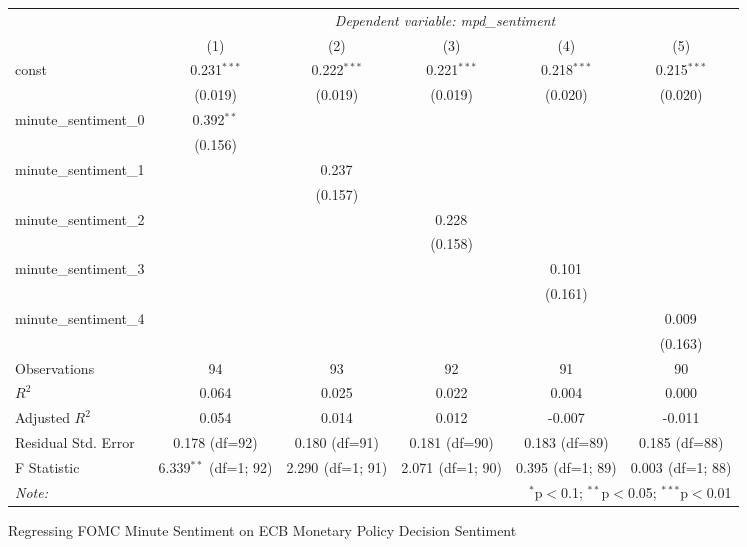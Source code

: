 \documentclass[12pt, letterpaper]{article}
\begin{document}
\begin{table}[H] 
\begin{adjustbox}{width=\textwidth}
\centering
\begin{tabular}{@{}lccccc@{}}
\hline \hline
& \multicolumn{5}{c}{\textit{Dependent variable: mpd\_sentiment}} \\
\cline{2-6}
& (1) & (2) & (3) & (4) & (5) \\
\hline
const & 0.231$^{***}$ & 0.222$^{***}$ & 0.221$^{***}$ & 0.218$^{***}$ & 0.215$^{***}$ \\
& (0.019) & (0.019) & (0.019) & (0.020) & (0.020) \\
minute\_sentiment\_0 & 0.392$^{**}$ & & & & \\
& (0.156) & & & & \\
minute\_sentiment\_1 & & 0.237$^{}$ & & & \\
& & (0.157) & & & \\
minute\_sentiment\_2 & & & 0.228$^{}$ & & \\
& & & (0.158) & & \\
minute\_sentiment\_3 & & & & 0.101$^{}$ & \\
& & & & (0.161) & \\
minute\_sentiment\_4 & & & & & 0.009$^{}$ \\
& & & & & (0.163) \\
\hline
Observations & 94 & 93 & 92 & 91 & 90 \\
$R^2$ & 0.064 & 0.025 & 0.022 & 0.004 & 0.000 \\
Adjusted $R^2$ & 0.054 & 0.014 & 0.012 & -0.007 & -0.011 \\
Residual Std. Error & 0.178 (df=92) & 0.180 (df=91) & 0.181 (df=90) & 0.183 (df=89) & 0.185 (df=88) \\
F Statistic & 6.339$^{**}$ (df=1; 92) & 2.290$^{}$ (df=1; 91) & 2.071$^{}$ (df=1; 90) & 0.395$^{}$ (df=1; 89) & 0.003$^{}$ (df=1; 88) \\
\hline \hline
\textit{Note:} & \multicolumn{5}{r}{$^{*}$p$<$0.1; $^{**}$p$<$0.05; $^{***}$p$<$0.01} \\
\end{tabular}
\end{adjustbox}
\end{table}


Regressing FOMC Minute Sentiment on ECB Monetary Policy Decision Sentiment
\end{document}
